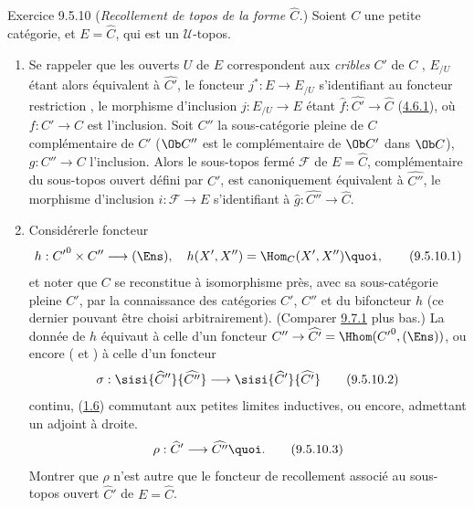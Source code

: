 \documentclass[10pt]{../fichiers-configuration-latex/smfart}
\begin{document}
\begin{enonce*}[remark]{Exercice 9.5.10}
(\emph{Recollement de topos de la forme $\widehat{C}$.}) Soient $C$
une petite catégorie, et $E=\widehat{C}$, qui est un
$𝒰$-topos.
\begin{enumerate}
\renewcommand{\theenumi}{\alph{enumi}}
\renewcommand{\labelenumi}{\theenumi)}
\item Se rappeler que les ouverts $U$ de $E$ correspondent aux
\emph{cribles} $C'$ de $C$ , $E_{/U}$
étant alors équivalent à $\widehat{C'}$, le foncteur
$j^{\ast}:E\rightarrow E_{/U}$ s'identifiant au foncteur restriction
, \ie le morphisme d'inclusion $j:E_{/U}\rightarrow E$ étant
$\widehat{f}:\widehat{C'}\rightarrow \widehat{C}$
(\hyperref[IV.subsubsec4.6.1]{4.6.1}), où $f:C'\rightarrow C$ est l'inclusion.
Soit $C''$ la sous-catégorie pleine de $C$ complémentaire de $C'$
(\ie $\Ob C''$ est le complémentaire de $\Ob C'$ dans $\Ob C$),
$g:C''\rightarrow C$ l'inclusion. Alors le sous-topos fermé
$\mathcal{F}$ de $E=\widehat{C}$, complémentaire du sous-topos
ouvert défini par $C'$, est canoniquement équivalent à
$\widehat{C''}$, le morphisme d'inclusion $i:\mathcal{F}\rightarrow
E$ s'identifiant à $\widehat{g}:\widehat{C''}\rightarrow
\widehat{C}$.

\item Considérer\pageoriginale le foncteur
\begin{equation*}
h:{C'}^0\times C''\longrightarrow (\Ens),\quad
h(X',X'')=\Hom_C(X',X''){\quoi},\tag{9.5.10.1}
\end{equation*}
et noter que $C$ se reconstitue à isomorphisme près, avec sa
sous-catégorie pleine $C'$, par la connaissance des catégories $C'$,
$C''$ et du bifoncteur $h$ (ce dernier pouvant être choisi
arbitrairement). (Comparer \hyperref[IV.subsec9.7.1]{9.7.1} plus bas.) La donnée
de $h$ équivaut à celle d'un foncteur $C''\rightarrow
\widehat{C'}=\Hhom({C'}^0,(\Ens))$, ou encore ( et
) à celle d'un foncteur
\begin{equation*}
\sigma:\sisi{\widehat{C}''}{\widehat{C''}}\longrightarrow
\sisi{\widehat{C}'}{\widehat{C'}}\tag{9.5.10.2}
\end{equation*}
continu, \ie (\hyperref[IV.cor1.6]{1.6}) commutant aux petites limites
inductives, ou encore, admettant un adjoint à droite.
\begin{equation*}
\rho:\widehat{C}'\longrightarrow \widehat{C''}{\quoi}.\tag{9.5.10.3}
\end{equation*}
Montrer que $\rho$ n'est autre que le foncteur de recollement
associé au sous-topos ouvert $\widehat{C}'$ de $E=\widehat{C}$.


\end{enumerate}
\end{enonce*}
\end{document}
